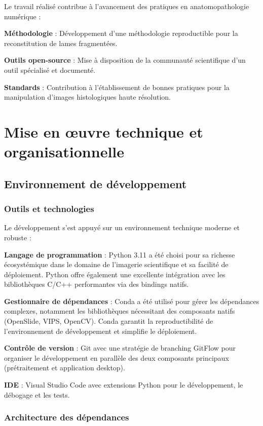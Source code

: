 \documentclass[12pt,a4paper]{report}
\begin{document}
Le travail réalisé contribue à l'avancement des pratiques en anatomopathologie numérique :

\textbf{Méthodologie} : Développement d'une méthodologie reproductible pour la reconstitution de lames fragmentées.

\textbf{Outils open-source} : Mise à disposition de la communauté scientifique d'un outil spécialisé et documenté.

\textbf{Standards} : Contribution à l'établissement de bonnes pratiques pour la manipulation d'images histologiques haute résolution.

\section{Mise en œuvre technique et organisationnelle}

\subsection{Environnement de développement}

\subsubsection{Outils et technologies}

Le développement s'est appuyé sur un environnement technique moderne et robuste :

\textbf{Langage de programmation} : Python 3.11 a été choisi pour sa richesse écosystémique dans le domaine de l'imagerie scientifique et sa facilité de déploiement. Python offre également une excellente intégration avec les bibliothèques C/C++ performantes via des bindings natifs.

\textbf{Gestionnaire de dépendances} : Conda a été utilisé pour gérer les dépendances complexes, notamment les bibliothèques nécessitant des composants natifs (OpenSlide, VIPS, OpenCV). Conda garantit la reproductibilité de l'environnement de développement et simplifie le déploiement.

\textbf{Contrôle de version} : Git avec une stratégie de branching GitFlow pour organiser le développement en parallèle des deux composants principaux (prétraitement et application desktop).

\textbf{IDE} : Visual Studio Code avec extensions Python pour le développement, le débogage et les tests.

\subsubsection{Architecture des dépendances}
\end{document}
